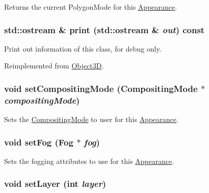 Returns the current PolygonMode for this \hyperlink{classm3g_1_1Appearance}{Appearance}. \hypertarget{classm3g_1_1Appearance_6fea17fa1532df3794f8cb39cb4f911f}{
\subsubsection[{print}]{\setlength{\rightskip}{0pt plus 5cm}std::ostream \& print (std::ostream \& {\em out}) const}}
\label{classm3g_1_1Appearance_6fea17fa1532df3794f8cb39cb4f911f}


Print out information of this class, for debug only. 

Reimplemented from \hyperlink{classm3g_1_1Object3D_6fea17fa1532df3794f8cb39cb4f911f}{Object3D}.\hypertarget{classm3g_1_1Appearance_b4dbfc0232132aeb0a7b7c5eaade82e1}{
\subsubsection[{setCompositingMode}]{\setlength{\rightskip}{0pt plus 5cm}void setCompositingMode ({\bf CompositingMode} $\ast$ {\em compositingMode})}}
\label{classm3g_1_1Appearance_b4dbfc0232132aeb0a7b7c5eaade82e1}


Sets the \hyperlink{classm3g_1_1CompositingMode}{CompositingMode} to user for this \hyperlink{classm3g_1_1Appearance}{Appearance}. \hypertarget{classm3g_1_1Appearance_bc1a612006d6b4c3d443ff6ab542c788}{
\subsubsection[{setFog}]{\setlength{\rightskip}{0pt plus 5cm}void setFog ({\bf Fog} $\ast$ {\em fog})}}
\label{classm3g_1_1Appearance_bc1a612006d6b4c3d443ff6ab542c788}


Sets the fogging attributes to use for this \hyperlink{classm3g_1_1Appearance}{Appearance}. \hypertarget{classm3g_1_1Appearance_fbd2fbd594c8ee140b028f505631f682}{
\subsubsection[{setLayer}]{\setlength{\rightskip}{0pt plus 5cm}void setLayer (int {\em layer})}}
\label{classm3g_1_1Appearance_fbd2fbd594c8ee140b028f505631f682}


